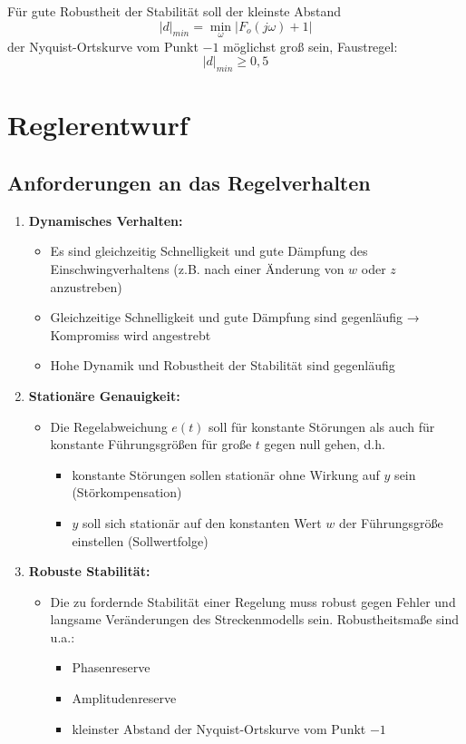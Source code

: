 \documentclass[10pt,a4paper]{article}
\begin{document}
Für gute Robustheit der Stabilität soll der kleinste Abstand
$$
	|d|_{min} = \min_{\omega}|F_o(j \omega) + 1|
$$
der Nyquist-Ortskurve vom Punkt $-1$ möglichst groß sein, Faustregel: 
$$
	|d|_{min} ≥ 0,5
$$

\section{Reglerentwurf}
\subsection{Anforderungen an das Regelverhalten}
\begin{enumerate}
	\item \textbf{Dynamisches Verhalten:}
	\begin{itemize}
		\item Es sind gleichzeitig Schnelligkeit und gute Dämpfung des Einschwingverhaltens (z.B. nach einer Änderung von $w$ oder $z$ anzustreben)
		\item Gleichzeitige Schnelligkeit und gute Dämpfung sind gegenläufig → Kompromiss wird angestrebt
		\item Hohe Dynamik und Robustheit der Stabilität sind gegenläufig
	\end{itemize}
	\item \textbf{Stationäre Genauigkeit:}
	\begin{itemize}
		\item Die Regelabweichung $e(t)$ soll für konstante Störungen als auch für konstante Führungsgrößen für große $t$ gegen null gehen, d.h.
		\begin{itemize}
			\item konstante Störungen sollen stationär ohne Wirkung auf $y$ sein (Störkompensation)
			\item $y$ soll sich stationär auf den konstanten Wert $w$ der Führungsgröße einstellen (Sollwertfolge)
		\end{itemize}
	\end{itemize}
	\item \textbf{Robuste Stabilität:}
	\begin{itemize}
		\item Die zu fordernde Stabilität einer Regelung muss robust gegen Fehler und langsame Veränderungen des Streckenmodells sein. Robustheitsmaße sind u.a.:
		\begin{itemize}
			\item Phasenreserve
			\item Amplitudenreserve
			\item kleinster Abstand der Nyquist-Ortskurve vom Punkt $-1$

\end{itemize}
\end{itemize}
\end{enumerate}
\end{document}
